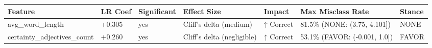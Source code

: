 \begin{tabular}{lllllll}
\toprule
Feature & LR Coef & Significant & Effect Size & Impact & Max Misclass Rate & Stance \\
\midrule
avg\_word\_length & +0.305 & yes & Cliff's delta (medium) & ↑ Correct & 81.5\% (NONE: (3.75, 4.101]) & NONE \\
certainty\_adjectives\_count & +0.260 & yes & Cliff's delta (negligible) & ↑ Correct & 53.1\% (FAVOR: (-0.001, 1.0]) & FAVOR \\
\bottomrule
\end{tabular}
